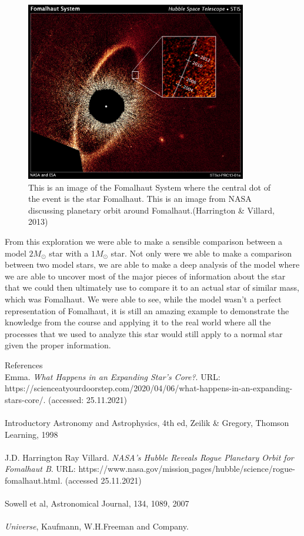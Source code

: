\documentclass{article}
\begin{document}
\begin{figure}
  \centering
  \includegraphics[width=0.86\textwidth]{Fomalhaut.jpg}
  \caption{This is an image of the Fomalhaut System where the central dot of the event is the star Fomalhaut. This is an image from NASA discussing planetary orbit around Fomalhaut.(Harrington \& Villard, 2013)}
  \label{fig:fomalhaut}
\end{figure}

\pagebreak

From this exploration we were able to make a sensible comparison between a model $2M_\odot$ star with a $1M_\odot$ star. Not only were we able to make a comparison between two model stars, we are able to make a deep analysis of the model where we are able to uncover most of the major pieces of information about the star that we could then ultimately use to compare it to an actual star of similar mass, which was Fomalhaut. We were able to see, while the model wasn't a perfect representation of Fomalhaut, it is still an amazing example to demonstrate the knowledge from the course and applying it to the real world where all the processes that we used to analyze this star would still apply to a normal star given the proper information. 


\pagebreak

References\\
Emma. \textit{What Happens in an Expanding Star's Core?}. URL: https://scienceatyourdoorstep.com/2020/04/06/what-happens-in-an-expanding-stars-core/. (accessed: 25.11.2021)\\\\
Introductory Astronomy and Astrophysics, 4th ed, Zeilik \& Gregory, Thomson Learning, 1998\\\\
J.D. Harrington Ray Villard. \textit{NASA's Hubble Reveals Rogue Planetary Orbit for Fomalhaut B}. URL: https://www.nasa.gov/mission$\_$pages/hubble/science/rogue-fomalhaut.html. (accessed 25.11.2021)\\\\
Sowell et al, Astronomical Journal, 134, 1089, 2007\\\\
\textit{Universe}, Kaufmann, W.H.Freeman and Company.

\pagebreak
\end{document}
